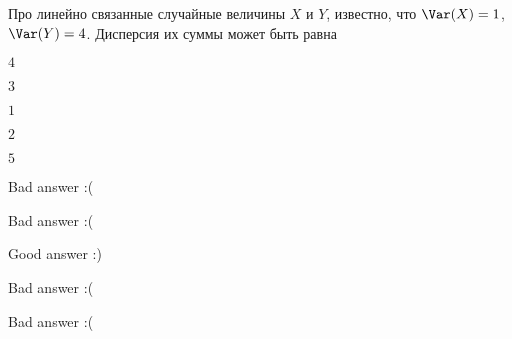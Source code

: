 
\begin{question}
Про линейно связанные случайные величины \(X\) и \(Y\), известно, что
\(\Var(X)=1\), \(\Var(Y)=4\). Дисперсия их суммы может быть равна
\begin{answerlist}
  \item \(4\)
  \item \(3\)
  \item \(1\)
  \item \(2\)
  \item \(5\)
\end{answerlist}
\end{question}

\begin{solution}
\begin{answerlist}
  \item Bad answer :(
  \item Bad answer :(
  \item Good answer :)
  \item Bad answer :(
  \item Bad answer :(
\end{answerlist}
\end{solution}

